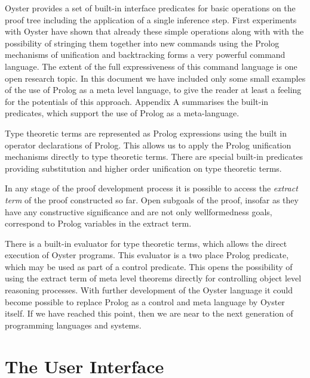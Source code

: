 \documentclass[11pt]{report}
\begin{document}
 Oyster provides a set of built-in interface predicates 
 for basic operations on the proof tree including the application
 of a single inference step. First experiments with Oyster
 have shown that already these simple operations along with with the 
 possibility of stringing them together into new commands using the
 Prolog mechanisms of unification and backtracking forms a
 very powerful command language. The extent of the 
 full expressiveness of this command language is one open research
 topic. In this document we have included only some small examples
 of the use of Prolog as a meta level language, to give the reader
 at least a feeling for the potentials of this approach.
 Appendix A summarises the built-in predicates, which support the
 use of Prolog as a meta-language.
  
 Type theoretic terms are represented as Prolog expressions
 using the built in operator declarations of Prolog. This
 allows us to apply the Prolog unification mechanisms directly
 to type theoretic terms. There are special built-in predicates
 providing substitution and higher order unification on 
 type theoretic terms. 
  
 In any stage of the proof development process it is possible
 to access the \emph{extract term} of the proof constructed
 so far. Open subgoals of the proof, insofar as they have any
 constructive significance and are not only wellformedness goals,
 correspond to Prolog variables in the extract term.
  
 There is a built-in evaluator for type theoretic terms,
 which allows the direct execution of Oyster programs. 
 This evaluator is a two place Prolog predicate, which may be used
 as part of a control predicate. This opens the possibility
 of using the extract term of meta level theorems directly      
 for controlling object level reasoning processes. 
 With further development of the Oyster language 
 it could become possible to replace Prolog as a control and meta 
 language by Oyster itself. If we have reached this point,
 then we are near to the next generation of programming languages
 and systems.
  
 
 \section{The User Interface}
 
\end{document}
